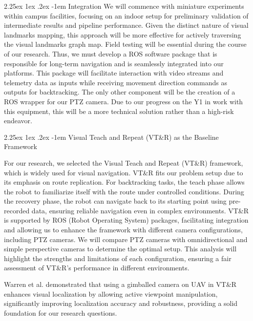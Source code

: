 \documentclass[runningheads]{llncs}
\makeatletter
\renewcommand\paragraph{\@startsection{paragraph}{4}{\z@}%
                                    {2.25ex \@plus1ex \@minus.2ex}%
                                    {-1em}%
                                    {\normalfont\normalsize\bfseries}}
\makeatother
\begin{document}
\paragraph{Integration}
We will commence with miniature experiments within campus facilities, focusing on an indoor setup for preliminary validation of intermediate results and pipeline performance. Given the distinct nature of visual landmarks mapping, this approach will be more effective for actively traversing the visual landmarks graph map.
Field testing will be essential during the course of our research. Thus, we must develop a ROS software package that is responsible for long-term navigation and is seamlessly integrated into our platforms. This package will facilitate interaction with video streams and telemetry data as inputs while receiving movement direction commands as outputs for backtracking. The only other component will be the creation of a ROS wrapper for our PTZ camera. Due to our progress on the Y1 in work with this equipment, this will be a more technical solution rather than a high-risk endeavor.

\paragraph{Visual Teach and Repeat (VT\&R) as the Baseline Framework}

For our research, we selected the Visual Teach and Repeat (VT\&R) framework, which is widely used for visual navigation. VT\&R fits our problem setup due to its emphasis on route replication. For backtracking tasks, the teach phase allows the robot to familiarize itself with the route under controlled conditions. During the recovery phase, the robot can navigate back to its starting point using pre-recorded data, ensuring reliable navigation even in complex environments. VT\&R is supported by ROS (Robot Operating System) packages, facilitating integration and allowing us to enhance the framework with different camera configurations, including PTZ cameras. We will compare PTZ cameras with omnidirectional and simple perspective cameras to determine the optimal setup. This analysis will highlight the strengths and limitations of each configuration, ensuring a fair assessment of VT\&R's performance in different environments.

Warren et al. \cite{PointMeIntoRightDirection} demonstrated that using a gimballed camera on UAV in VT\&R enhances visual localization by allowing active viewpoint manipulation, significantly improving localization accuracy and robustness, providing a solid foundation for our research questions.
\end{document}
